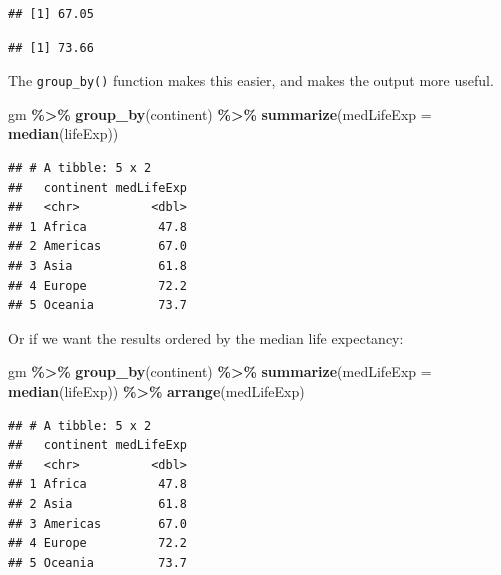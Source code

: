 \documentclass[
]{krantz}
\newenvironment{Shaded}{\begin{snugshade}}{\end{snugshade}}
\newcommand{\DataTypeTok}[1]{\textcolor[rgb]{0.13,0.29,0.53}{#1}}
\newcommand{\KeywordTok}[1]{\textcolor[rgb]{0.13,0.29,0.53}{\textbf{#1}}}
\newcommand{\NormalTok}[1]{#1}
\newcommand{\OperatorTok}[1]{\textcolor[rgb]{0.81,0.36,0.00}{\textbf{#1}}}
\newcommand{\StringTok}[1]{\textcolor[rgb]{0.31,0.60,0.02}{#1}}
\begin{document}
\begin{verbatim}
## [1] 67.05
\end{verbatim}

\begin{Shaded}
\end{Shaded}

\begin{verbatim}
## [1] 73.66
\end{verbatim}

The \texttt{group\_by()} function makes this easier, and makes the output more useful.

\begin{Shaded}
\begin{Highlighting}[]
\NormalTok{gm }\OperatorTok{\%\textgreater{}\%}\StringTok{ }
\StringTok{  }\KeywordTok{group\_by}\NormalTok{(continent) }\OperatorTok{\%\textgreater{}\%}\StringTok{ }
\StringTok{  }\KeywordTok{summarize}\NormalTok{(}\DataTypeTok{medLifeExp =} \KeywordTok{median}\NormalTok{(lifeExp)) }
\end{Highlighting}
\end{Shaded}

\begin{verbatim}
## # A tibble: 5 x 2
##   continent medLifeExp
##   <chr>          <dbl>
## 1 Africa          47.8
## 2 Americas        67.0
## 3 Asia            61.8
## 4 Europe          72.2
## 5 Oceania         73.7
\end{verbatim}

Or if we want the results ordered by the median life expectancy:

\begin{Shaded}
\begin{Highlighting}[]
\NormalTok{gm }\OperatorTok{\%\textgreater{}\%}\StringTok{ }
\StringTok{  }\KeywordTok{group\_by}\NormalTok{(continent) }\OperatorTok{\%\textgreater{}\%}\StringTok{ }
\StringTok{  }\KeywordTok{summarize}\NormalTok{(}\DataTypeTok{medLifeExp =} \KeywordTok{median}\NormalTok{(lifeExp)) }\OperatorTok{\%\textgreater{}\%}\StringTok{ }
\StringTok{  }\KeywordTok{arrange}\NormalTok{(medLifeExp)}
\end{Highlighting}
\end{Shaded}

\begin{verbatim}
## # A tibble: 5 x 2
##   continent medLifeExp
##   <chr>          <dbl>
## 1 Africa          47.8
## 2 Asia            61.8
## 3 Americas        67.0
## 4 Europe          72.2
## 5 Oceania         73.7
\end{verbatim}
\end{document}
